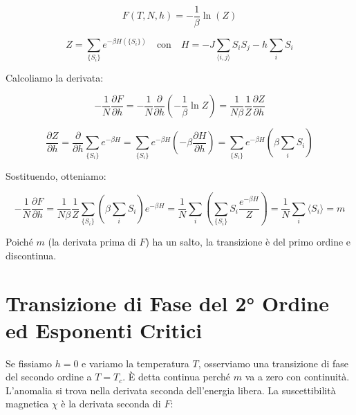 \begin{equation} \label{eq:ch18_3}
F(T, N, h) = -\frac{1}{\beta} \ln(Z)
\end{equation}

\begin{equation} \label{eq:ch18_4}
Z = \sum_{\{S_i\}} e^{-\beta H(\{S_i\})} \quad \text{con} \quad H = -J\sum_{\langle i,j \rangle} S_i S_j - h\sum_i S_i
\end{equation}

Calcoliamo la derivata:

\begin{equation} \label{eq:ch18_5}
-\frac{1}{N}\frac{\partial F}{\partial h} = -\frac{1}{N} \frac{\partial}{\partial h} \left( -\frac{1}{\beta} \ln Z \right) = \frac{1}{N\beta} \frac{1}{Z} \frac{\partial Z}{\partial h}
\end{equation}

\begin{equation} \label{eq:ch18_6}
\frac{\partial Z}{\partial h} = \frac{\partial}{\partial h} \sum_{\{S_i\}} e^{-\beta H} = \sum_{\{S_i\}} e^{-\beta H} \left( -\beta \frac{\partial H}{\partial h} \right) = \sum_{\{S_i\}} e^{-\beta H} \left( \beta \sum_i S_i \right)
\end{equation}

Sostituendo, otteniamo:

\begin{equation} \label{eq:ch18_7}
-\frac{1}{N}\frac{\partial F}{\partial h} = \frac{1}{N\beta} \frac{1}{Z} \sum_{\{S_i\}} \left(\beta \sum_i S_i\right) e^{-\beta H} = \frac{1}{N} \sum_i \left( \sum_{\{S_i\}} S_i \frac{e^{-\beta H}}{Z} \right) = \frac{1}{N} \sum_i \langle S_i \rangle = m
\end{equation}

Poiché $m$ (la derivata prima di $F$) ha un salto, la transizione è del primo ordine e discontinua.


\section{Transizione di Fase del 2° Ordine ed Esponenti Critici}
Se fissiamo $h=0$ e variamo la temperatura $T$, osserviamo una transizione di fase del secondo ordine a $T = T_c$. È detta continua perché $m$ va a zero con continuità. L'anomalia si trova nella derivata seconda dell'energia libera.
La suscettibilità magnetica $\chi$ è la derivata seconda di $F$:

\vspace{0.5cm}
\noindent{}
\vspace{0.5cm}

